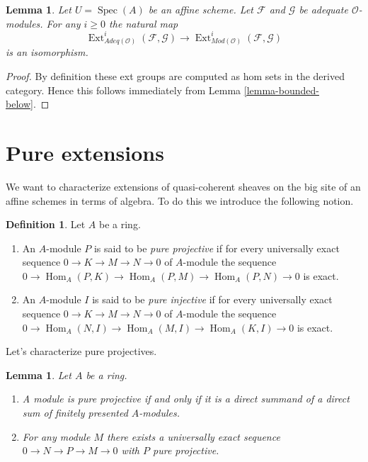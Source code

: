 \documentclass{stacks-project}
\theoremstyle{plain}
\newtheorem{lemma}[subsection]{Lemma}
\theoremstyle{definition}
\newtheorem{definition}[subsection]{Definition}
\theoremstyle{remark}
\numberwithin{equation}{subsection}
\def\Spec{\mathop{\mathrm{Spec}}}
\def\Hom{\mathop{\mathrm{Hom}}\nolimits}
\def\Ext{\mathop{\mathrm{Ext}}\nolimits}
\begin{document}
\begin{lemma}
\label{lemma-ext-adequate}
Let $U = \Spec(A)$ be an affine scheme.
Let $\mathcal{F}$ and $\mathcal{G}$ be adequate $\mathcal{O}$-modules.
For any $i \geq 0$ the natural map
$$
\Ext^i_{\textit{Adeq}(\mathcal{O})}(\mathcal{F}, \mathcal{G})
\longrightarrow
\Ext^i_{\textit{Mod}(\mathcal{O})}(\mathcal{F}, \mathcal{G})
$$
is an isomorphism.
\end{lemma}

\begin{proof}
By definition these ext groups are computed as hom sets in the
derived category. Hence this follows immediately from
Lemma \ref{lemma-bounded-below}.
\end{proof}









\section{Pure extensions}
\label{section-pure}

\noindent
We want to characterize extensions of quasi-coherent sheaves on
the big site of an affine schemes in terms of algebra. To do this
we introduce the following notion.

\begin{definition}
\label{definition-pure}
Let $A$ be a ring.
\begin{enumerate}
\item An $A$-module $P$ is said to be {\it pure projective}
if for every universally exact sequence
$0 \to K \to M \to N \to 0$ of $A$-module the sequence
$0 \to \Hom_A(P, K) \to \Hom_A(P, M) \to \Hom_A(P, N) \to 0$
is exact.
\item An $A$-module $I$ is said to be {\it pure injective}
if for every universally exact sequence
$0 \to K \to M \to N \to 0$ of $A$-module the sequence
$0 \to \Hom_A(N, I) \to \Hom_A(M, I) \to \Hom_A(K, I) \to 0$
is exact.
\end{enumerate}
\end{definition}

\noindent
Let's characterize pure projectives.

\begin{lemma}
\label{lemma-pure-projective}
Let $A$ be a ring.
\begin{enumerate}
\item A module is pure projective if and only if
it is a direct summand of a direct sum of finitely presented $A$-modules.
\item For any module $M$ there exists a universally exact sequence
$0 \to N \to P \to M \to 0$ with $P$ pure projective.
\end{enumerate}
\end{lemma}
\end{document}
